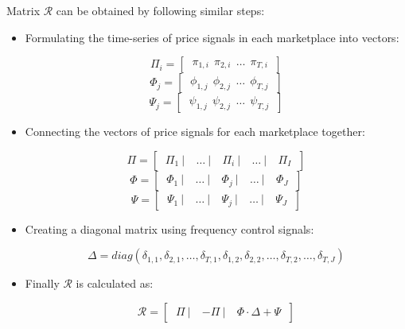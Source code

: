 Matrix $\mathcal{R}$ can be obtained by following similar steps:

\begin{itemize}
	\item Formulating the time-series of price signals in each marketplace into vectors:
	
	\begin{equation*}
	\Pi_{i} = 
	\begin{bmatrix}
	~\pi_{1,i}~~\pi_{2,i}~~\dots~~\pi_{T,i}~
	\end{bmatrix}
	\end{equation*}
	\begin{equation*}
	\Phi_{j} = 
	\begin{bmatrix}
	~\phi_{1,j}~~\phi_{2,j}~~\dots~~\phi_{T,j}~
	\end{bmatrix}
	\end{equation*}
	\begin{equation*}
	\Psi_{j} = 
	\begin{bmatrix}
	~\psi_{1,j}~~\psi_{2,j}~~\dots~~\psi_{T,j}~
	\end{bmatrix}
	\end{equation*}
	
	\item Connecting the vectors of price signals for each marketplace together:
	
	\begin{equation*}
	\Pi=
	\begin{bmatrix}
	~\Pi_{1}~|~&\dots~|~&\Pi_{i} ~|~&\dots~|~&\Pi_{I}~
	\end{bmatrix}
	\end{equation*}
	\begin{equation*}
	\Phi=
	\begin{bmatrix}
	~\Phi_{1}~|~&\dots~|~&\Phi_{j} ~|~&\dots~|~&\Phi_{J}~
	\end{bmatrix}
	\end{equation*}
	\begin{equation*}
	\Psi =
	\begin{bmatrix}
	~\Psi_{1}~|~&\dots~|~&\Psi_{j} ~|~&\dots~|~&\Psi_{J}~
	\end{bmatrix}
	\end{equation*}
	
	\item Creating a diagonal matrix using frequency control signals:
	
	\begin{equation}
	\label{eq:decision-f-revenue-end}
	\Delta = diag (
	\delta_{1,1}, \delta_{2,1},\dots , \delta_{T,1},\delta_{1,2},\delta_{2,2}, \dots,\delta_{T,2}, \dots, \delta_{T,J})
	\end{equation}
	
	\item Finally $\mathcal{R}$ is calculated as:
	
	\begin{equation}
	\label{eq:decision-f-revenue-1}
	\mathcal{R} =
	\begin{bmatrix}
	~\Pi~|~&-\Pi~|~&\Phi \cdot \Delta + \Psi~
	\end{bmatrix}
	\end{equation}
	
\end{itemize}
